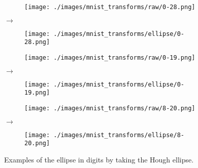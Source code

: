 \begin{figure}[H]
    \centering

    \begin{subfigure}{.15\columnwidth}
        \centering
        \texttt{[image: ./images/mnist\_transforms/raw/0-28.png]}
        \caption{}
        \label{fig:ellipse_orig1}
    \end{subfigure}%
    $\rightarrow$
    \begin{subfigure}{.15\columnwidth}
        \centering
        \texttt{[image: ./images/mnist\_transforms/ellipse/0-28.png]}
        \caption{}
        \label{fig:ellipse_transform1}
    \end{subfigure}

    \par\medskip

    \begin{subfigure}{.15\columnwidth}
        \centering
        \texttt{[image: ./images/mnist\_transforms/raw/0-19.png]}
        \caption{}
        \label{fig:ellipse_orig2}
    \end{subfigure}%
    $\rightarrow$
    \begin{subfigure}{.15\columnwidth}
        \centering
        \texttt{[image: ./images/mnist\_transforms/ellipse/0-19.png]}
        \caption{}
        \label{fig:ellipse_transform2}
    \end{subfigure}%

    \par\medskip

    \begin{subfigure}{.15\columnwidth}
        \centering
        \texttt{[image: ./images/mnist\_transforms/raw/8-20.png]}
        \caption{}
        \label{fig:ellipse_orig3}
    \end{subfigure}%
    $\rightarrow$
    \begin{subfigure}{.15\columnwidth}
        \centering
        \texttt{[image: ./images/mnist\_transforms/ellipse/8-20.png]}
        \caption{}
        \label{fig:ellipse_transform3}
    \end{subfigure}

    \caption{Examples of the ellipse in digits by taking the Hough ellipse.}
    \label{fig:ellipse_examples}
\end{figure}

